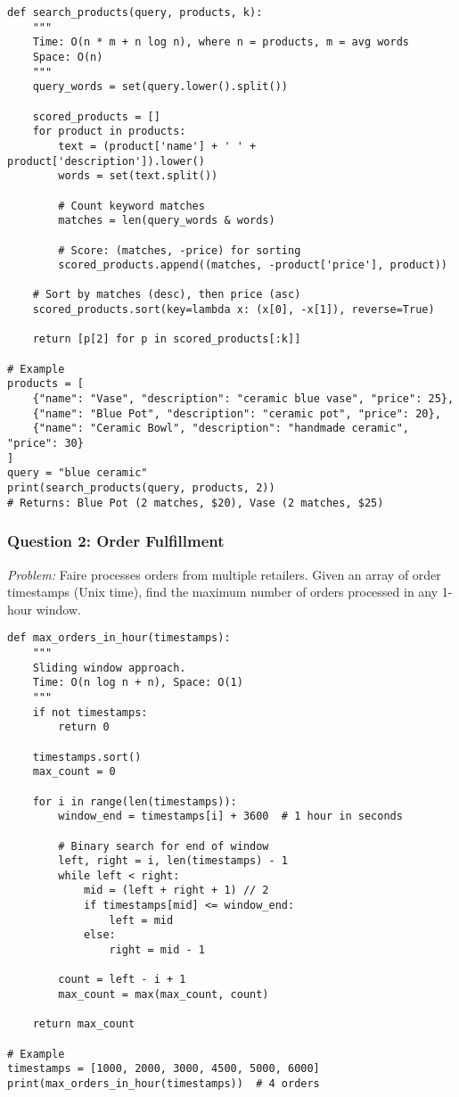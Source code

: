 \documentclass[11pt,letterpaper]{article}
\begin{document}
\begin{lstlisting}
def search_products(query, products, k):
    """
    Time: O(n * m + n log n), where n = products, m = avg words
    Space: O(n)
    """
    query_words = set(query.lower().split())

    scored_products = []
    for product in products:
        text = (product['name'] + ' ' + product['description']).lower()
        words = set(text.split())

        # Count keyword matches
        matches = len(query_words & words)

        # Score: (matches, -price) for sorting
        scored_products.append((matches, -product['price'], product))

    # Sort by matches (desc), then price (asc)
    scored_products.sort(key=lambda x: (x[0], -x[1]), reverse=True)

    return [p[2] for p in scored_products[:k]]

# Example
products = [
    {"name": "Vase", "description": "ceramic blue vase", "price": 25},
    {"name": "Blue Pot", "description": "ceramic pot", "price": 20},
    {"name": "Ceramic Bowl", "description": "handmade ceramic", "price": 30}
]
query = "blue ceramic"
print(search_products(query, products, 2))
# Returns: Blue Pot (2 matches, $20), Vase (2 matches, $25)
\end{lstlisting}

\subsubsection{Question 2: Order Fulfillment}

\textit{Problem:} Faire processes orders from multiple retailers. Given an array of order timestamps (Unix time), find the maximum number of orders processed in any 1-hour window.

\begin{lstlisting}
def max_orders_in_hour(timestamps):
    """
    Sliding window approach.
    Time: O(n log n + n), Space: O(1)
    """
    if not timestamps:
        return 0

    timestamps.sort()
    max_count = 0

    for i in range(len(timestamps)):
        window_end = timestamps[i] + 3600  # 1 hour in seconds

        # Binary search for end of window
        left, right = i, len(timestamps) - 1
        while left < right:
            mid = (left + right + 1) // 2
            if timestamps[mid] <= window_end:
                left = mid
            else:
                right = mid - 1

        count = left - i + 1
        max_count = max(max_count, count)

    return max_count

# Example
timestamps = [1000, 2000, 3000, 4500, 5000, 6000]
print(max_orders_in_hour(timestamps))  # 4 orders
\end{lstlisting}
\end{document}
